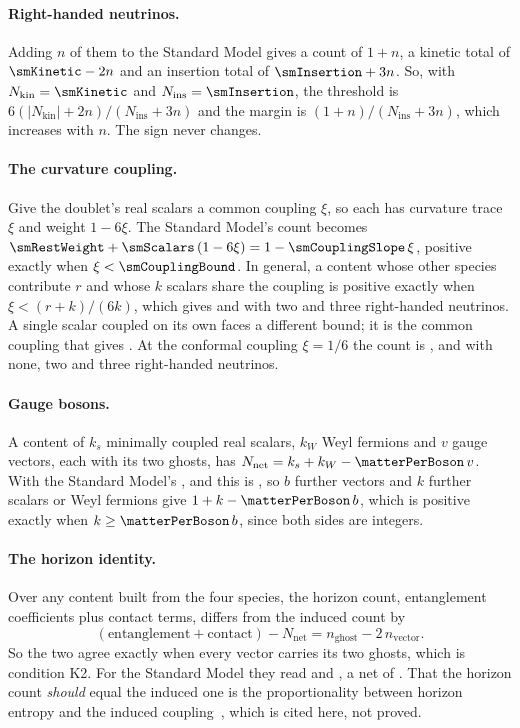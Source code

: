 \documentclass[aps,prd,reprint,amsmath,amssymb,superscriptaddress,nofootinbib]{revtex4-2}
\newcommand{\Nnet}{N_{\mathrm{net}}}
\newcommand{\Nkin}{N_{\mathrm{kin}}}
\newcommand{\Nins}{N_{\mathrm{ins}}}
\begin{document}
\paragraph{Right-handed neutrinos.}
Adding $n$ of them to the Standard Model gives a count of $1+n$, a kinetic total of
$\smKinetic-2n$ and an insertion total of $\smInsertion+3n$. So, with $\Nkin=\smKinetic$ and
$\Nins=\smInsertion$, the threshold is $6(|\Nkin|+2n)/(\Nins+3n)$ and the margin is
$(1+n)/(\Nins+3n)$,
which increases with $n$. The sign never changes.

\paragraph{The curvature coupling.}
Give the doublet's \smScalars{} real scalars a common coupling $\xi$, so each has curvature
trace $\xi$ and weight $1-6\xi$. The Standard Model's count becomes
$\smRestWeight+\smScalars\,(1-6\xi)=1-\smCouplingSlope\,\xi$, positive exactly when
$\xi<\smCouplingBound$. In general, a content whose other species contribute $r$ and whose
$k$ scalars share the coupling is positive exactly when $\xi<(r+k)/(6k)$, which gives
\nuTwoCouplingBound{} and \nuThreeCouplingBound{} with two and three right-handed
neutrinos. A single scalar coupled on its own faces a different bound; it is the common
coupling that gives \smCouplingBound. At the conformal coupling $\xi=1/6$ the count is
\smConformalCount, \nuTwoConformalCount{} and \nuThreeConformalCount{} with none, two
and three right-handed neutrinos.

\paragraph{Gauge bosons.}
A content of $k_s$ minimally coupled real scalars, $k_W$ Weyl fermions and $v$ gauge
vectors, each with its two ghosts, has $\Nnet=k_s+k_W-\matterPerBoson\,v$. With the
Standard Model's \smScalars, \smWeyl{} and \gaugeVectors{} this is \smNet, so $b$ further
vectors and $k$ further scalars or Weyl fermions give $1+k-\matterPerBoson\,b$, which is
positive exactly when $k\ge\matterPerBoson\,b$, since both sides are integers.

\paragraph{The horizon identity.}
Over any content built from the four species, the horizon count, entanglement
coefficients plus contact terms, differs from the induced count by
\begin{equation}
  (\text{entanglement}+\text{contact})-\Nnet=n_{\text{ghost}}-2\,n_{\text{vector}} .
\end{equation}
So the two agree exactly when every vector carries its two ghosts, which is condition K2.
For the Standard Model they read \smEntanglement{} and \smContact, a net of \smNet. That the
horizon count \emph{should} equal the induced one is the proportionality between horizon
entropy and the induced coupling~\cite{LarsenWilczek1996,FrolovFursaevZelnikov1997}, which
is cited here, not proved.
\end{document}

